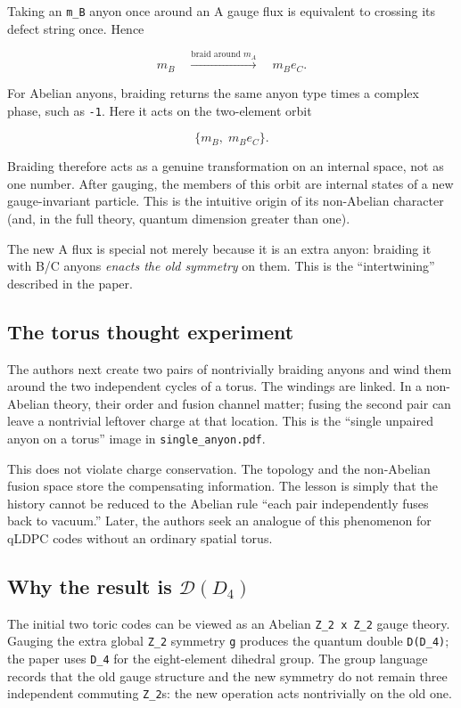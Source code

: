 \documentclass[
]{article}
\begin{document}
Taking an \texttt{m\_B} anyon once around an A gauge flux is equivalent
to crossing its defect string once. Hence

\[
m_B \quad\xrightarrow{\text{braid around }m_A}\quad m_B e_C.
\]

For Abelian anyons, braiding returns the same anyon type times a complex
phase, such as \texttt{-1}. Here it acts on the two-element orbit

\[
\{m_B,\;m_Be_C\}.
\]

Braiding therefore acts as a genuine transformation on an internal
space, not as one number. After gauging, the members of this orbit are
internal states of a new gauge-invariant particle. This is the intuitive
origin of its non-Abelian character (and, in the full theory, quantum
dimension greater than one).

The new A flux is special not merely because it is an extra anyon:
braiding it with B/C anyons \emph{enacts the old symmetry} on them. This
is the ``intertwining'' described in the paper.

\subsection{The torus thought
experiment}\label{the-torus-thought-experiment}

The authors next create two pairs of nontrivially braiding anyons and
wind them around the two independent cycles of a torus. The windings are
linked. In a non-Abelian theory, their order and fusion channel matter;
fusing the second pair can leave a nontrivial leftover charge at that
location. This is the ``single unpaired anyon on a torus'' image in
\texttt{single\_anyon.pdf}.

This does not violate charge conservation. The topology and the
non-Abelian fusion space store the compensating information. The lesson
is simply that the history cannot be reduced to the Abelian rule ``each
pair independently fuses back to vacuum.'' Later, the authors seek an
analogue of this phenomenon for qLDPC codes without an ordinary spatial
torus.

\subsection{\texorpdfstring{Why the result is
\(\mathcal D(D_4)\)}{Why the result is \textbackslash mathcal D(D\_4)}}\label{why-the-result-is-mathcal-dd_4}

The initial two toric codes can be viewed as an Abelian
\texttt{Z\_2\ x\ Z\_2} gauge theory. Gauging the extra global
\texttt{Z\_2} symmetry \texttt{g} produces the quantum double
\texttt{D(D\_4)}; the paper uses \texttt{D\_4} for the eight-element
dihedral group. The group language records that the old gauge structure
and the new symmetry do not remain three independent commuting
\texttt{Z\_2}s: the new operation acts nontrivially on the old one.
\end{document}
